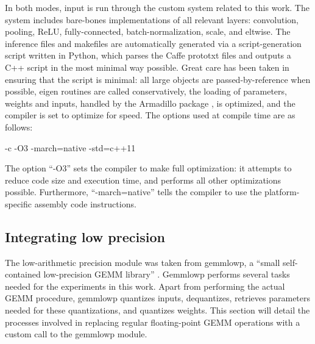 In both modes, input is run through the custom system related to this work. The system includes bare-bones implementations of all relevant layers: convolution, pooling, ReLU, fully-connected, batch-normalization, scale, and eltwise. The inference files and makefiles are automatically generated via a script-generation script written in Python, which parses the Caffe prototxt files and outputs a C++ script in the most minimal way possible. Great care has been taken in ensuring that the script is minimal: all large objects are passed-by-reference when possible, eigen routines are called conservatively, the loading of parameters, weights and inputs, handled by the Armadillo package \cite{eigen_vs_armadillo}, is optimized, and the compiler is set to optimize for speed. The options used at compile time are as follows: 

\lstset{language=make}
-c -O3 -march=native -std=c++11

The option ``-O3'' sets the compiler to make full optimization: it attempts to reduce code size and execution time, and performs all other optimizations possible. Furthermore, ``-march=native'' tells the compiler to use the platform-specific assembly code instructions.

\subsection{Integrating low precision}
The low-arithmetic precision module was taken from gemmlowp, a ``small self-contained low-precision GEMM library'' \cite{gemmlowp}. Gemmlowp performs several tasks needed for the experiments in this work. Apart from performing the actual GEMM procedure, gemmlowp quantizes inputs, dequantizes, retrieves parameters needed for these quantizations, and quantizes weights. This section will detail the processes involved in replacing regular floating-point GEMM operations with a custom call to the gemmlowp module.

